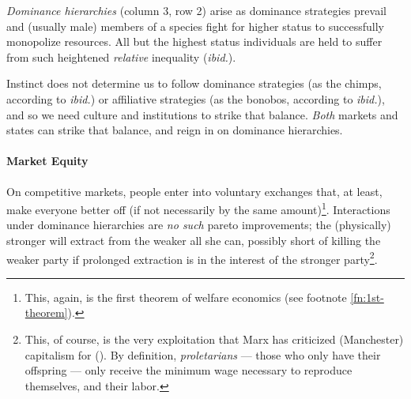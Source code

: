

\emph{Dominance hierarchies} (column 3, row 2) arise as dominance strategies prevail and (usually male) members of a species fight for higher status to successfully monopolize resources.  All but the highest status individuals are held to suffer from such heightened \emph{relative} inequality (\emph{ibid.}).

Instinct does not determine us to follow dominance strategies (as the chimps, according to \emph{ibid.}) or affiliative strategies (as the bonobos, according to \emph{ibid.}), and so we need culture and institutions to strike that balance. \emph{Both} markets and states can strike that balance, and reign in on dominance hierarchies.

\paragraph{Market Equity}  \label{sec:market-equity} On competitive markets, people enter into voluntary exchanges that, at least, make everyone better off (if not necessarily by the same amount)\footnote{
	This, again, is the first theorem of welfare economics (see footnote \ref{fn:1st-theorem}).}. 
Interactions under dominance hierarchies are \emph{no such} pareto improvements; the (physically) stronger will extract from the weaker all she can, possibly short of killing the weaker party if prolonged extraction is in the interest of the stronger party\footnote{
	This, of course, is the very exploitation that Marx has criticized (Manchester) capitalism for (\citeyear{MarxEngels-1848-aa,Marx-1867-aa}). By definition, \emph{proletarians} --- those who only have their offspring --- only receive the minimum wage necessary to reproduce themselves, and their labor.}.

